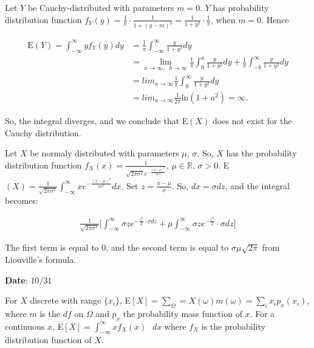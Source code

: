 \documentclass[12pt]{article}
\newcommand{\R}{\mathbb{R}}
\newcommand{\nspace}{\vspace*{.5cm}}
\newcommand{\nline}{\nspace \noindent}
\begin{document}
\nline
Let $Y$ be Cauchy-distributed with parameters $m=0$. $Y$ has probability distribution function $f_Y (y) = \frac{1}{\pi} \cdot \frac{1}{1+(y-m)^2} = \frac{1}{1+y^2} \cdot \frac{1}{\pi}$, when $m=0$. Hence 

\begin{align*}
\text{E}(Y) = \int_{- \infty}^{\infty} y f_Y(y) dy &= \frac{1}{\pi} \int_{- \infty}^{\infty} \frac{y}{1+y^2} dy \\
&= \lim_{a \rightarrow \infty, \text{ } b \rightarrow \infty} \frac{1}{\pi} \int_{0}^{a} \frac{y}{1+y^2} dy + \frac{1}{\pi} \int_{-b}^{\infty} \frac{y}{1+y^2} dy \\
&= lim_{a \rightarrow \infty} \frac{1}{\pi} \int_{0}^{\infty} \frac{y}{1+y^2} dy \\
&= lim_{a \rightarrow \infty} \frac{1}{2 \pi} \text{ln}(1+a^2) = \infty.
\end{align*}

\noindent
So, the integral diverges, and we conclude that E$(X)$ does not exist for the Cauchy distribution. 

\nline
Let $X$ be normaly distributed with parameters $\mu$, $\sigma$. So, $X$ has the probability distribution function $f_X(x) = \frac{1}{\sqrt{2 \pi \sigma^2} e^{-\frac{(x-\mu)^2}{2 \sigma^2}}}$, $\mu \in \R$, $\sigma > 0$. E$(X) = \frac{1}{\sqrt{2 \pi \sigma^2}} \int_{- \infty}^{\infty} x e^{-\frac{(x-\mu)^2}{2 \sigma^2}} dx$. Set $z = \frac{x-\mu}{\sigma}$. So, $dx = \sigma dz$, and the integral becomes:

\begin{align*}
\frac{1}{\sqrt{2 \pi \sigma^2}} \Big [ \int_{- \infty}^{\infty} \sigma z e^{- \frac{z^2}{2} \cdot \sigma dz}+ \mu \int_{- \infty}^{\infty} \sigma z e^{- \frac{z^2}{2}} \cdot \sigma dz \Big ]
\end{align*}

\noindent
The first term is equal to $0$, and the second term is equal to $\sigma \mu \sqrt{2 \pi}$ from Liouville's formula. 

\begin{flushright}
\textbf{Date}: $10/31$
\end{flushright}

\nline
For $X$ discrete with range $\{ x_i \}$, E$[X] = \sum_{\Omega} = X( \omega )m( \omega ) = \sum_{i} x_i p_x (x_i)$, where $m$ is the $df$ on $\Omega$ and $p_x$ the probability mass function of $x$. For a continuous $x$, E$[X]= \int_{- \infty}^{\infty} x f_X(x) \text{ } dx$ where $f_X$ is the probability distribution function of $X$. 
\end{document}
